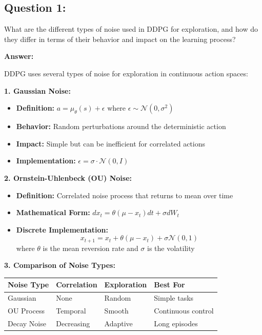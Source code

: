 \documentclass[12pt]{article}
\begin{document}
{{{\subsection{Question 1:}

What are the different types of noise used in DDPG for exploration, and how do they differ in terms of their behavior and impact on the learning process?

\textbf{Answer:}

DDPG uses several types of noise for exploration in continuous action spaces:

\textbf{1. Gaussian Noise:}
\begin{itemize}
    \item \textbf{Definition:} $a = \mu_\theta(s) + \epsilon$ where $\epsilon \sim \mathcal{N}(0, \sigma^2)$
    \item \textbf{Behavior:} Random perturbations around the deterministic action
    \item \textbf{Impact:} Simple but can be inefficient for correlated actions
    \item \textbf{Implementation:} $\epsilon = \sigma \cdot \mathcal{N}(0, I)$
\end{itemize}

\textbf{2. Ornstein-Uhlenbeck (OU) Noise:}
\begin{itemize}
    \item \textbf{Definition:} Correlated noise process that returns to mean over time
    \item \textbf{Mathematical Form:} $dx_t = \theta(\mu - x_t)dt + \sigma dW_t$
    \item \textbf{Discrete Implementation:}
    \[
    x_{t+1} = x_t + \theta(\mu - x_t) + \sigma \mathcal{N}(0, 1)
    \]
    where $\theta$ is the mean reversion rate and $\sigma$ is the volatility
\end{itemize}

\textbf{3. Comparison of Noise Types:}

\begin{table}[h]
\centering
\begin{tabular}{|l|l|l|l|}
\hline
\textbf{Noise Type} & \textbf{Correlation} & \textbf{Exploration} & \textbf{Best For} \\
\hline
Gaussian & None & Random & Simple tasks \\
OU Process & Temporal & Smooth & Continuous control \\
Decay Noise & Decreasing & Adaptive & Long episodes \\
\hline
\end{tabular}
\end{table}

}}}
\end{document}
